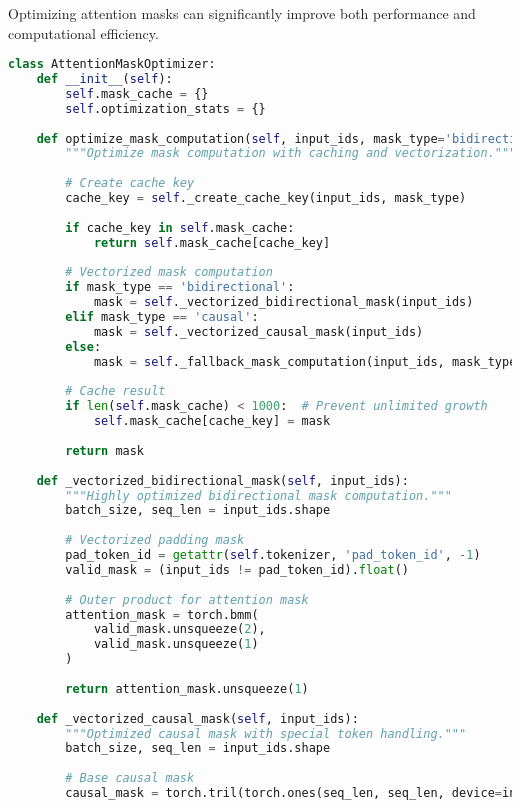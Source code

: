 Optimizing attention masks can significantly improve both performance and computational efficiency.

\begin{lstlisting}[language=Python, caption=Attention mask optimization techniques]
class AttentionMaskOptimizer:
    def __init__(self):
        self.mask_cache = {}
        self.optimization_stats = {}
        
    def optimize_mask_computation(self, input_ids, mask_type='bidirectional'):
        """Optimize mask computation with caching and vectorization."""
        
        # Create cache key
        cache_key = self._create_cache_key(input_ids, mask_type)
        
        if cache_key in self.mask_cache:
            return self.mask_cache[cache_key]
            
        # Vectorized mask computation
        if mask_type == 'bidirectional':
            mask = self._vectorized_bidirectional_mask(input_ids)
        elif mask_type == 'causal':
            mask = self._vectorized_causal_mask(input_ids)
        else:
            mask = self._fallback_mask_computation(input_ids, mask_type)
            
        # Cache result
        if len(self.mask_cache) < 1000:  # Prevent unlimited growth
            self.mask_cache[cache_key] = mask
            
        return mask
        
    def _vectorized_bidirectional_mask(self, input_ids):
        """Highly optimized bidirectional mask computation."""
        batch_size, seq_len = input_ids.shape
        
        # Vectorized padding mask
        pad_token_id = getattr(self.tokenizer, 'pad_token_id', -1)
        valid_mask = (input_ids != pad_token_id).float()
        
        # Outer product for attention mask
        attention_mask = torch.bmm(
            valid_mask.unsqueeze(2),
            valid_mask.unsqueeze(1)
        )
        
        return attention_mask.unsqueeze(1)
        
    def _vectorized_causal_mask(self, input_ids):
        """Optimized causal mask with special token handling."""
        batch_size, seq_len = input_ids.shape
        
        # Base causal mask
        causal_mask = torch.tril(torch.ones(seq_len, seq_len, device=input_ids.device))
        

\end{lstlisting}
